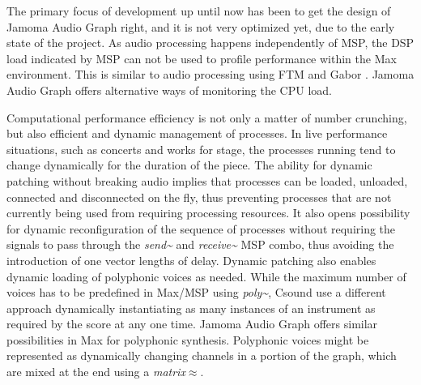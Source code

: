 \documentclass[twoside,a4paper]{article}
\begin{document}
The primary focus of development up until now has been to get the design of Jamoma Audio Graph right, and it is not very optimized yet, due to the early state of the project.
As audio processing happens independently of MSP, the DSP load indicated by MSP can not be used to profile performance within the Max environment.
This is similar to audio processing using FTM and Gabor \cite{Schnell:2005_Gabor}.
Jamoma Audio Graph offers alternative ways of monitoring the CPU load.


 

Computational performance efficiency is not only a matter of number crunching, but also efficient and dynamic management of processes.
In live performance situations, such as concerts and works for stage, the processes running tend to change dynamically for the duration of the piece.
The ability for  dynamic patching without breaking audio implies that processes can be loaded, unloaded, connected and disconnected on the fly, thus preventing processes that are not currently being used from requiring processing resources.
It also opens possibility for dynamic reconfiguration of the sequence of processes without requiring the signals to pass through the \emph{send\textasciitilde} and \emph{receive\textasciitilde} MSP combo, thus avoiding the introduction of one vector lengths of delay.
Dynamic patching also enables dynamic loading of polyphonic voices as needed.
While the maximum number of voices has to be predefined in Max/MSP using \emph{poly\textasciitilde}, Csound use a different approach dynamically instantiating as many instances of an instrument as required by the score at any one time.
Jamoma Audio Graph offers similar possibilities in Max for polyphonic synthesis.
Polyphonic voices might be represented as dynamically changing channels in a portion of the graph, which are mixed at the end using a \emph{matrix$\approx$}.
\end{document}
